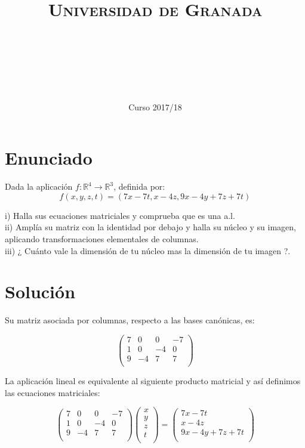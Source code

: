 \documentclass[11pt, a4paper]{article}
\title{
  \normalfont \normalsize 
  \textsc{Universidad de Granada} \\ [25pt]    %
  \horrule{0.5pt} \\[0.4cm] %
  \huge \sffamily\subject\\ %
  \horrule{2pt} \\[0.5cm] %
}
\author{\Large\sffamily{\docauthor}}
\date{\vspace{-1.5em} \normalsize \sffamily Curso 2017/18}
\newif\IfInSansMode
\newcommand{\R}{\mathbb{R}} \newcommand{\N}{\mathbb{N}}
\theoremstyle{theorem-style}
\theoremstyle{definition-style}
\theoremstyle{remark-style}
\theoremstyle{example-style}
\begin{document}
\maketitle  %
\vfill
\begin{center}
\end{center}
\newpage
\tableofcontents    %
\newpage



\section{Enunciado}
Dada la aplicación $f: \R^4 \to \R^3$, definida por: 
$$f(x,y,z,t)=(7x-7t,x-4z,9x-4y+7z+7t)$$
	
i) Halla sus ecuaciones matriciales y comprueba que es una a.l. \\
ii) Amplía su matriz con la identidad por debajo y halla su núcleo y su imagen, aplicando transformaciones elementales de columnas. \\
iii) ¿ Cuánto vale la dimensión de tu núcleo mas la dimensión de tu imagen ?. \\

\section{Solución}

Su matriz asociada por columnas, respecto a las bases canónicas, es:

$$\begin{pmatrix}
7 & 0 & 0 & -7\\
1 & 0 & -4 & 0\\
9 & -4 & 7 & 7\\
\end{pmatrix}$$

La aplicación lineal es equivalente al siguiente producto matricial y así definimos las ecuaciones matriciales:

$$\begin{pmatrix}
7 & 0 & 0 & -7\\
1 & 0 & -4 & 0\\
9 & -4 & 7 & 7\\
\end{pmatrix}
\begin{pmatrix}
x \\
y \\
z \\
t \\
\end{pmatrix} = 
\begin{pmatrix}
7x-7t \\
x-4z \\
9x-4y+7z+7t \\
\end{pmatrix}$$
\end{document}

